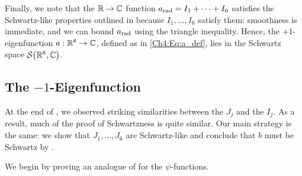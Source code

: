 Finally, we note that the $\mathbb{R} \to \mathbb{C}$ function $a_{\operatorname{rad}} = I_1 + \cdots + I_6$ satisfies the Schwartz-like properties outlined in  because $I_1, \ldots, I_6$ satisfy them: smoothness is immediate, and we can bound $a_{\operatorname{rad}}$ using the triangle inequality. Hence, the $+1$-eigenfunction $a : \mathbb{R}^8 \to \mathbb{C}$, defined as in \eqref{Ch4:Eq:a_def}, lies in the Schwartz space $\mathcal{S}\!\left( \mathbb{R}^8, \mathbb{C} \right)$.



\subsection{The $-1$-Eigenfunction}
\label{Ch4:Subec:Schwartzness_b}

At the end of , we observed striking similarities between the $J_j$ and the $I_j$. As a result, much of the proof of Schwartzness is quite similar. Our main strategy is the same: we show that $J_1, \ldots, J_6$ are Schwartz-like and conclude that $b$ must be Schwartz by .

We begin by proving an analogue of  for the $\psi$-functions.

